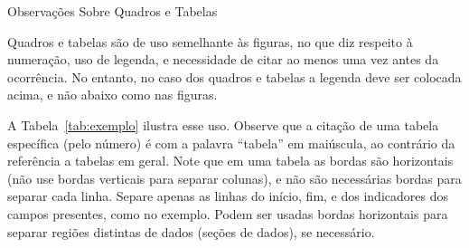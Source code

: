 \documentclass[a4paper, 12pt]{ppgeb}
\makeatletter
\renewcommand{\section}{\@startsection
{section}
{1}
{0mm}
{-\baselineskip}
{0.5\baselineskip}
{\large\bfseries\scshape}}
\makeatother
\begin{document}
\section{Observações Sobre Quadros e Tabelas}

Quadros e tabelas são de uso semelhante às figuras, no que diz respeito à numeração, uso de legenda, e necessidade de citar ao menos uma vez antes da ocorrência. No entanto, no caso dos quadros e tabelas a legenda deve ser colocada acima, e não abaixo como nas figuras.

A Tabela~\ref{tab:exemplo} ilustra esse uso. Observe que a citação de uma tabela específica (pelo número) é com a palavra ``tabela'' em maiúscula, ao contrário da referência a tabelas em geral. Note que em uma tabela as bordas são horizontais (não use bordas verticais para separar colunas), e não são necessárias bordas para separar cada linha. Separe apenas as linhas do início, fim, e dos indicadores dos campos presentes, como no exemplo. Podem ser usadas bordas horizontais para separar regiões distintas de dados (seções de dados), se necessário.
\end{document}
